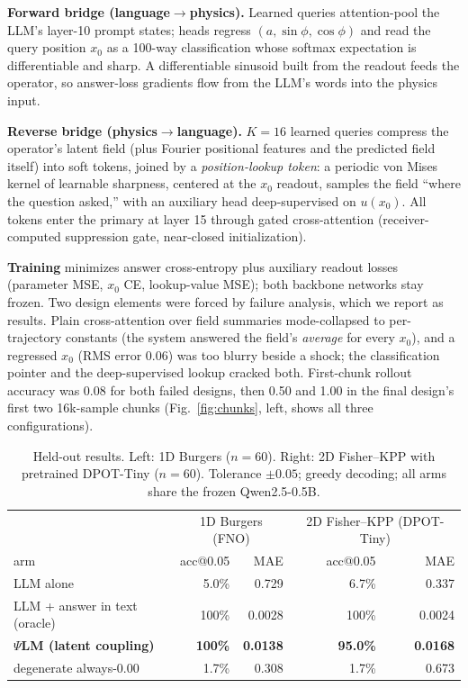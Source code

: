 \documentclass[11pt]{article}
\newcommand{\psilm}{$\Psi$LM}
\begin{document}
\textbf{Forward bridge (language$\to$physics).} Learned queries attention-pool the LLM's layer-10 prompt states; heads regress $(a,\sin\phi,\cos\phi)$ and read the query position $x_0$ as a 100-way classification whose softmax expectation is differentiable and sharp. A differentiable sinusoid built from the readout feeds the operator, so answer-loss gradients flow from the LLM's words into the physics input.

\textbf{Reverse bridge (physics$\to$language).} $K{=}16$ learned queries compress the operator's latent field (plus Fourier positional features and the predicted field itself) into soft tokens, joined by a \emph{position-lookup token}: a periodic von Mises kernel of learnable sharpness, centered at the $x_0$ readout, samples the field ``where the question asked,'' with an auxiliary head deep-supervised on $u(x_0)$. All tokens enter the primary at layer 15 through gated cross-attention (receiver-computed suppression gate, near-closed initialization).

\textbf{Training} minimizes answer cross-entropy plus auxiliary readout losses (parameter MSE, $x_0$ CE, lookup-value MSE); both backbone networks stay frozen. Two design elements were forced by failure analysis, which we report as results. Plain cross-attention over field summaries mode-collapsed to per-trajectory constants (the system answered the field's \emph{average} for every $x_0$), and a regressed $x_0$ (RMS error 0.06) was too blurry beside a shock; the classification pointer and the deep-supervised lookup cracked both. First-chunk rollout accuracy was 0.08 for both failed designs, then 0.50 and 1.00 in the final design's first two 16k-sample chunks (Fig.~\ref{fig:chunks}, left, shows all three configurations).

\begin{table}[t]
\centering
\caption{Held-out results. Left: 1D Burgers ($n{=}60$). Right: 2D Fisher--KPP with pretrained DPOT-Tiny ($n{=}60$). Tolerance $\pm0.05$; greedy decoding; all arms share the frozen Qwen2.5-0.5B.}
\label{tab:main}
\small
\begin{tabular}{lrr@{\hspace{8mm}}rr}
\toprule
 & \multicolumn{2}{c}{1D Burgers (FNO)} & \multicolumn{2}{c}{2D Fisher--KPP (DPOT-Tiny)} \\
arm & acc@0.05 & MAE & acc@0.05 & MAE \\
\midrule
LLM alone & 5.0\% & 0.729 & 6.7\% & 0.337 \\
LLM + answer in text (oracle) & 100\% & 0.0028 & 100\% & 0.0024 \\
\textbf{\psilm{} (latent coupling)} & \textbf{100\%} & \textbf{0.0138} & \textbf{95.0\%} & \textbf{0.0168} \\
degenerate always-0.00 & 1.7\% & 0.308 & 1.7\% & 0.673 \\
\bottomrule
\end{tabular}
\end{table}
\end{document}
